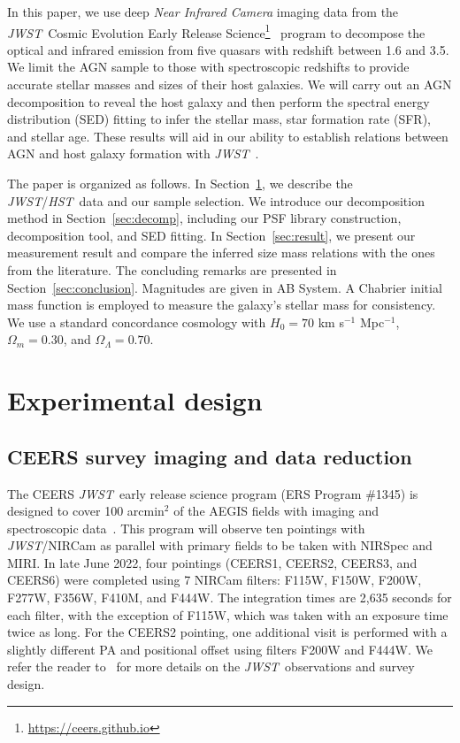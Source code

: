 \documentclass[twocolumn]{aastex631}
\newcommand{\hst}{{\it HST}}
\newcommand{\jwst}{{\it JWST}}
\begin{document}
In this paper, we use deep \textit{Near Infrared Camera} \citep[NIRCam,][]{Rieke05} imaging data from the \jwst\ Cosmic Evolution Early Release Science\footnote{\url{https://ceers.github.io}}~\citep[CEERS,][]{CEERS} program to decompose the optical and infrared emission from five quasars with redshift between 1.6 and 3.5. We limit the AGN sample to those with spectroscopic redshifts to provide accurate stellar masses and sizes of their host galaxies. We will carry out an AGN decomposition to reveal the host galaxy and then perform the spectral energy distribution (SED) fitting to infer the stellar mass, star formation rate (SFR), and stellar age. These results will aid in our ability to establish relations between AGN and host galaxy formation with \jwst\ \citep{Kocevski2022}.

The paper is organized as follows. In Section~\ref{sec:design}, we describe the \jwst/\hst\ data and our sample selection. We introduce our decomposition method in Section~\ref{sec:decomp}, including our PSF library construction, decomposition tool, and SED fitting. In Section~\ref{sec:result}, we present our measurement result and compare the inferred size mass relations with the ones from the literature. The concluding remarks are presented in Section~\ref{sec:conclusion}. Magnitudes are given in AB System. A Chabrier initial mass function is employed to measure the galaxy's stellar mass for consistency. We use a standard concordance cosmology with $H_0= 70$ km s$^{-1}$ Mpc$^{-1}$, $\Omega{_m} = 0.30$, and $\Omega{_\Lambda} = 0.70$.


\section{Experimental design} \label{sec:design}

\subsection{CEERS survey imaging and data reduction}
The CEERS \jwst\ early release science program (ERS Program \#1345) is designed to cover 100 arcmin$^2$ of the AEGIS fields with imaging and spectroscopic data~\citep{CEERS}. This program will observe ten pointings with \jwst/NIRCam as parallel with primary fields to be taken with NIRSpec and MIRI. In late June 2022, four pointings  (CEERS1, CEERS2, CEERS3, and CEERS6) were completed using 7 NIRCam filters: F115W, F150W, F200W, F277W, F356W, F410M, and F444W. The integration times are 2,635 seconds for each filter, with the exception of F115W, which was taken with an exposure time twice as long. For the CEERS2 pointing, one additional visit is performed with a slightly different PA and positional offset using filters F200W and F444W. We refer the reader to~\citet{Finkelstein2022} for more details on the \jwst\ observations and survey design.
\end{document}
